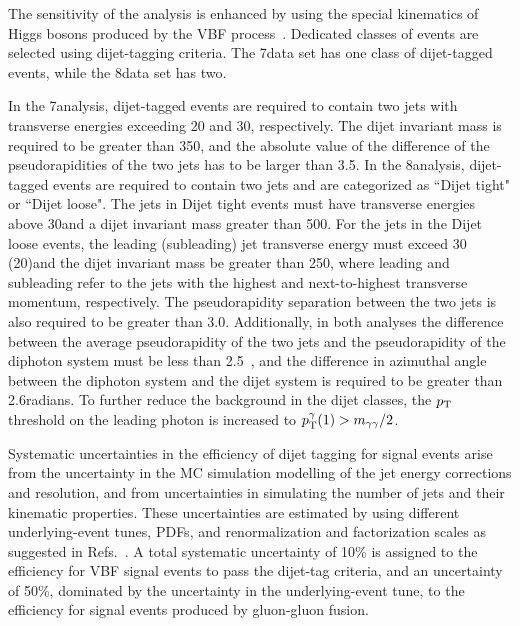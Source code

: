 \documentclass[12pt,twoside,a4paper,cmspaper,final,collab]{cms-tdr}
\begin{document}
The sensitivity of the analysis is enhanced by using
the special kinematics of Higgs bosons produced by the VBF process~\cite{Ballestrero:2008gf}.
Dedicated classes of events are selected using dijet-tagging criteria.
The 7\TeV data set has one class of dijet-tagged events, while
the 8\TeV data set has two.

In the 7\TeV analysis, dijet-tagged events are required to contain two jets with transverse
energies exceeding 20 and 30\GeV, respectively. The dijet invariant mass is required to
be greater than  350\GeV, and the absolute value of the difference of the pseudorapidities of the
two jets has to be larger than 3.5.
In the 8\TeV analysis, dijet-tagged events are required to
contain two jets and are categorized as ``Dijet tight" or ``Dijet loose".
The jets in Dijet tight events must have transverse energies above 30\GeV and  a
dijet invariant mass greater than  500\GeV.
For the jets in the Dijet loose events, the leading (subleading) jet transverse energy
must exceed 30 (20)\GeV and the dijet invariant mass be greater than
250\GeV, where leading and subleading refer to the jets with the highest and
next-to-highest transverse momentum, respectively.
The pseudorapidity separation between the two jets
is also required to be greater than 3.0. Additionally, in both analyses the difference between
the average pseudorapidity of the two jets and the pseudorapidity of the diphoton system must
be less than 2.5~\cite{Rainwater:1996ud}, and the difference in azimuthal
angle between the diphoton system and the dijet system is required to
be greater than 2.6\unit{radians}.
To further reduce the background in the dijet classes, the $p_{\mathrm{T}}$ threshold on the leading
photon is increased to $p_{\mathrm{T}}^{\gamma}(1) > m_{\gamma\gamma}/2$.

Systematic uncertainties in the efficiency of dijet tagging for
signal events arise from the uncertainty in the MC simulation modelling of the jet energy
corrections and resolution, and from uncertainties in simulating
the number of jets and their kinematic properties.
These uncertainties are estimated by using  different underlying-event tunes,
PDFs, and renormalization and factorization scales
as suggested in Refs.~\cite{LHCHiggsCrossSectionWorkingGroup:2011ti,Dittmaier:2012vm}.
A total systematic uncertainty of 10\% is assigned to the efficiency
for VBF signal events to pass the dijet-tag criteria, and an
uncertainty of 50\%, dominated by the uncertainty in the
underlying-event tune, to the efficiency for signal events
produced by gluon-gluon fusion.
\end{document}
